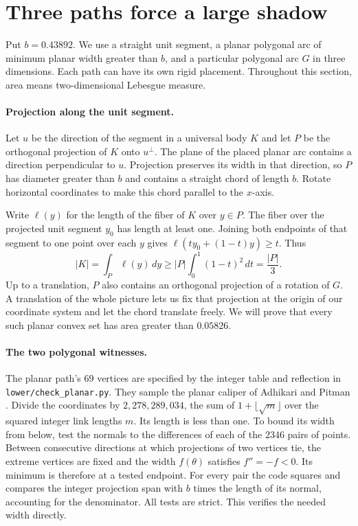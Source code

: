 \section{Three paths force a large shadow}\label{sec:shadow}

Put $b=0.43892$. We use a straight unit segment, a planar polygonal arc
of minimum planar width greater than $b$, and a particular polygonal arc
$G$ in three dimensions. Each path can have its own rigid placement.
Throughout this section, area means two-dimensional Lebesgue measure.

\paragraph{Projection along the unit segment.}
Let $u$ be the direction of the segment in a universal body $K$ and
let $P$ be the orthogonal projection of $K$ onto $u^\perp$. The plane of
the placed planar arc contains a direction perpendicular to $u$. Projection
preserves its width in that direction, so $P$ has diameter greater than
$b$ and contains a straight chord of length $b$. Rotate horizontal
coordinates to make this chord parallel to the $x$-axis.

Write $\ell(y)$ for the length of the fiber of $K$ over $y\in P$.
The fiber over the projected unit segment $y_0$ has length at least one.
Joining both endpoints of that segment to one point over each $y$ gives
$\ell(ty_0+(1-t)y)\ge t$. Thus
\[
 |K|=\int_P\ell(y)\,dy
 \ge |P|\int_0^1(1-t)^2\,dt=\frac{|P|}{3}.
 \tag{1}\label{eq:fiber}
\]
Up to a translation, $P$ also contains an orthogonal projection of a
rotation of $G$. A translation of the whole picture lets us fix that
projection at the origin of our coordinate system and let the chord
translate freely. We will prove that every such planar convex set
has area greater than $0.05826$.

\paragraph{The two polygonal witnesses.}
The planar path's $69$ vertices are specified by the integer table and
reflection in \texttt{lower/check\_planar.py}. They sample the planar
caliper of Adhikari and Pitman \cite{caliper}. Divide the coordinates by
$2{,}278{,}289{,}034$, the sum of $1+\lfloor\sqrt{m}\rfloor$ over the
squared integer link lengths $m$. Its length is less than one. To bound its
width from below, test the normals to the differences of each of the $2346$
pairs of points. Between consecutive directions at which projections of
two vertices tie, the extreme vertices are fixed and the width $f(\theta)$
satisfies $f''=-f<0$. Its minimum is therefore at a tested endpoint.
For every pair the code squares and compares the integer projection span
with $b$ times the length of its normal, accounting for the denominator.
All tests are strict. This verifies the needed width directly.

